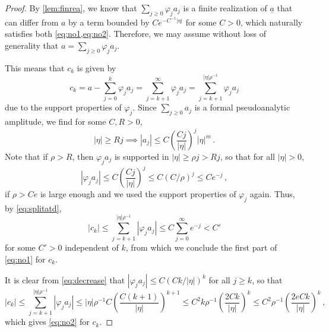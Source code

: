\documentclass[
	fontsize=11pt, 
	twoside=false, 
	abstract=true, 
	a4paper,
]{scrartcl}
\newcommand{\abs}[1]{\left\lvert#1\right\rvert}
\newcommand{\ud}[1]{\underline{#1}}
\begin{document}
\begin{proof}
	By \cref{lem:finrea}, we know that $\sum_{j\geq 0}\varphi_j a_j$ is a finite realization of $\ud{a}$ that can differ from $a$ by a term bounded by $Ce^{-C^{-1}\abs{\eta}}$ for some $C>0$, which naturally satisfies both 
	\cref{eq:no1,eq:no2}. Therefore, we may assume without loss of generality that $a= \sum_{j\geq 0} \varphi_j a_j$. 

	This means that $c_k$ is given by
	\begin{equation}\label{eq:splitatd}
		c_k = a- \sum_{j=0}^k \varphi_ja_j = \sum_{j=k+1}^\infty \varphi_ja_j = \sum_{j=k+1}^{\abs{\eta}\rho^{-1}} \varphi_ja_j 
	\end{equation}
	due to the support properties of $\varphi_j$. 
	Since $\sum_{j\geq 0} a_j$ is a formal pseudoanalytic amplitude, we find for some $C,R>0$,
	\[
		\abs{\eta} \geq Rj\implies \abs{a_j} \leq C\left(\frac{Cj}{\abs{\eta}}\right)^j \abs{\eta}^m\,.
	\]
	Note that if $\rho> R$, then $\varphi_j a_j$ is supported in $\abs{\eta} \geq \rho j > Rj$, so that for all $\abs{\eta}>0$,
	\begin{equation}\label{eq:decrease}
		\abs{\varphi_ja_j} \leq C\left(\frac{Cj}{\abs{\eta}}\right)^j \leq C(C/\rho)^j \leq C e^{-j}\,,
	\end{equation}
	if $\rho>Ce$ is large enough and we used the support properties of $\varphi_j$ again. Thus, by \cref{eq:splitatd},
	\[
		\abs{c_k} \leq \sum_{j=k+1}^{\abs{\eta}\rho^{-1}} \abs{\varphi_ja_j} \leq C\sum_{j=0}^\infty e^{-j} < C'
	\]
	for some $C'>0$ independent of $k$, from which we conclude the first part of \cref{eq:no1} for $c_k$.

	It is clear from \cref{eq:decrease} that $\abs{\varphi_{j} a_{j}} \leq C(Ck/\abs{\eta})^k$ for all $j\geq k$, so that 
	\[
	\abs{c_k} \leq \sum_{j=k+1}^{\abs{\eta}\rho^{-1}} \abs{\varphi_ja_j} \leq \abs{\eta}\rho^{-1} C\left(\frac{C(k+1)}{\abs{\eta}}\right)^{k+1} \leq C^2k\rho^{-1} \left(\frac{2Ck}{\abs{\eta}}\right)^{k} \leq C^2\rho^{-1} \left(\frac{2eCk}{\abs{\eta}}\right)^{k}\,,
	\]
	which gives \cref{eq:no2} for $c_k$. 
\end{proof}
\end{document}
